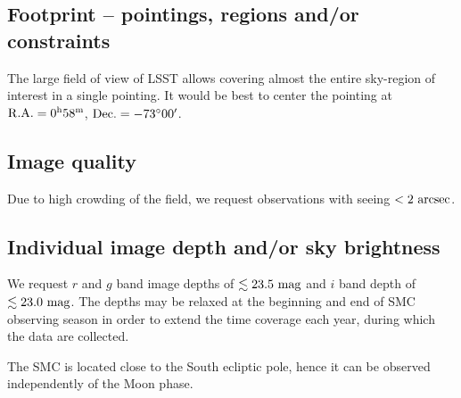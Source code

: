\documentclass[12pt,letterpaper]{article}
\begin{document}
\subsection{Footprint -- pointings, regions and/or constraints}

The large field of view of LSST allows covering almost the entire sky-region 
of interest in a single pointing. 
It would be best to center the pointing at  
${\rm R.A.} = 0^{\rm h}58^{\rm m}$,  %
${\rm Dec.} = -73^{\circ}00'$. 

\subsection{Image quality}

Due to high crowding of the field, we request observations with seeing $< 2~{\rm arcsec}$.


\subsection{Individual image depth and/or sky brightness}

We request $r$ and $g$ band image depths of $\lesssim23.5~{\rm mag}$ 
and $i$ band depth of $\lesssim23.0~{\rm mag}$.  
The depths may be relaxed at the beginning and end of SMC observing season 
in order to extend the time coverage each year, during which the data are collected.

The SMC is located close to the South ecliptic pole, hence it can be observed 
independently of the Moon phase.
\end{document}
